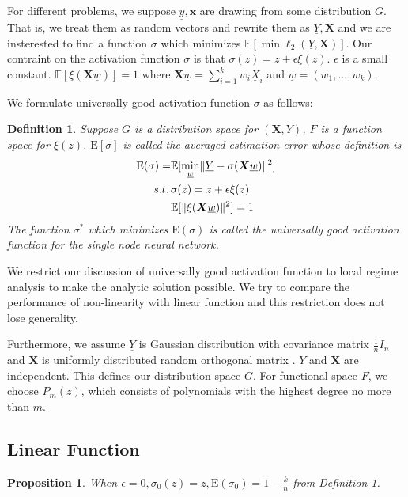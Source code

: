 \documentclass[conference,letterpaper]{IEEEtran}
\newtheorem{definition}{Definition}
\newtheorem{proposition}{Proposition}
\DeclarePairedDelimiter\norm{\lVert}{\rVert}
\def\E{\mathbb{E}}
\begin{document}
For different problems, we suppose $\underline{y}, \bm{x}$ are drawing from some distribution $G$.
That is, we treat them as random vectors and rewrite them as $\underline{Y}, \bm{X}$ and
we are insterested to find a function $\sigma$ which minimizes
$\E[ \min \ell_2(\underline{Y}, \bm{X})]$.
Our contraint on the activation function $\sigma$ is that
$\sigma(z) = z + \epsilon \xi(z)$.
$\epsilon$ is a small constant.
$\E[\xi(\bm{X}\underline{w})]=1$ where
$\bm{X}\underline{w} = \sum_{i=1}^k w_i \underline{X}_i$ and  $\underline{w}=(w_1, \dots, w_k)$.

We formulate universally good activation function $\sigma$ as follows:
\begin{definition}\label{def:ug}
Suppose $G$ is a distribution space for $(\bm{X}, \underline{Y})$,
$F$ is a function space for $\xi(z)$.
$\mathrm{E}[\sigma]$ is called the averaged estimation error whose definition is
\begin{align}\label{eq:ug}
\mathrm{E}(\sigma) = & \E[ \min_{\underline{w}} \norm{\underline{Y} - \sigma(\bm{X} \underline{w})}^2] \nonumber\\
s.t. \,& \sigma(z) = z + \epsilon \xi(z) \nonumber \\
&\E[\norm{\xi(\bm{X}\underline{w})}^2]=1
\end{align}
The function $\sigma^*$ which minimizes $\mathrm{E}(\sigma)$
is called the universally good activation function for the single node neural network.
\end{definition}

We restrict our discussion of universally good activation function to local regime analysis to make the analytic solution possible.
We try to compare the performance of non-linearity with linear function and this restriction does not lose generality.

Furthermore, we assume $\underline{Y}$ is Gaussian distribution with covariance matrix $\frac{1}{n} I_n$ and
$\bm{X}$ is uniformly distributed random orthogonal matrix \cite{rm}.
$\underline{Y}$ and $\bm{X}$ are independent.
This defines our distribution space $G$.
For functional space $F$, we choose $P_m(z)$,
which consists of polynomials with the highest degree no more than $m$.
\subsection{Linear Function}
\begin{proposition}\label{prop:linear}
When $\epsilon = 0, \sigma_0(z) = z, \mathrm{E}(\sigma_0) = 1 - \frac{k}{n}$ from Definition \ref{def:ug}.
\end{proposition}
\end{document}

